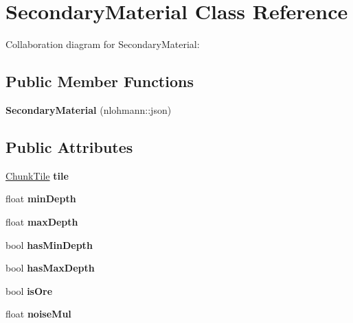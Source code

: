\hypertarget{classSecondaryMaterial}{\section{Secondary\-Material Class Reference}
\label{classSecondaryMaterial}
}


Collaboration diagram for Secondary\-Material\-:
\subsection*{Public Member Functions}
\begin{DoxyCompactItemize}
\item 
\hypertarget{classSecondaryMaterial_a69b96c4aacf0309d95e0ce9270ff74ad}{{\bfseries Secondary\-Material} (nlohmann\-::json)}\label{classSecondaryMaterial_a69b96c4aacf0309d95e0ce9270ff74ad}

\end{DoxyCompactItemize}
\subsection*{Public Attributes}
\begin{DoxyCompactItemize}
\item 
\hypertarget{classSecondaryMaterial_a2f6dbbe3c785234d802e193e20784307}{\hyperlink{classChunkTile}{Chunk\-Tile} {\bfseries tile}}\label{classSecondaryMaterial_a2f6dbbe3c785234d802e193e20784307}

\item 
\hypertarget{classSecondaryMaterial_a13a32cb245d947c7f7a5d7e904ace8b1}{float {\bfseries min\-Depth}}\label{classSecondaryMaterial_a13a32cb245d947c7f7a5d7e904ace8b1}

\item 
\hypertarget{classSecondaryMaterial_aac62f19526e18476aba6b7ebeba41cd6}{float {\bfseries max\-Depth}}\label{classSecondaryMaterial_aac62f19526e18476aba6b7ebeba41cd6}

\item 
\hypertarget{classSecondaryMaterial_aebfb0894af42a44a46010ff6f3b45d5c}{bool {\bfseries has\-Min\-Depth}}\label{classSecondaryMaterial_aebfb0894af42a44a46010ff6f3b45d5c}

\item 
\hypertarget{classSecondaryMaterial_a91408bbd26707e4bd3f7159158d48525}{bool {\bfseries has\-Max\-Depth}}\label{classSecondaryMaterial_a91408bbd26707e4bd3f7159158d48525}

\item 
\hypertarget{classSecondaryMaterial_acb0fb055763493d6a15b04fdf6b3285b}{bool {\bfseries is\-Ore}}\label{classSecondaryMaterial_acb0fb055763493d6a15b04fdf6b3285b}

\item 
\hypertarget{classSecondaryMaterial_a8efd21aa89ac3bead26261e5812054f9}{float {\bfseries noise\-Mul}}\label{classSecondaryMaterial_a8efd21aa89ac3bead26261e5812054f9}

\end{DoxyCompactItemize}
